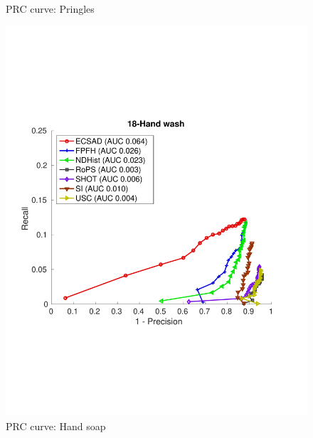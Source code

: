 \documentclass[10pt,twocolumn,letterpaper]{article}
\begin{document}
\begin{figure}[h]
\begin{minipage}[b]{.3\textwidth}
\caption{PRC curve: Pringles}\label{fig:pringles}
\end{minipage}
\begin{minipage}[b]{.3\textwidth}
\includegraphics[clip, trim=0.7cm 6cm 0.7cm 6cm,width=1.0\linewidth, height= 1.0\linewidth, keepaspectratio]{img/18-Hand_wash_L2_RATIO_zoom.pdf}
\caption{PRC curve: Hand soap}\label{fig:hand_soap}
\end{minipage}
\end{figure}
\end{document}
